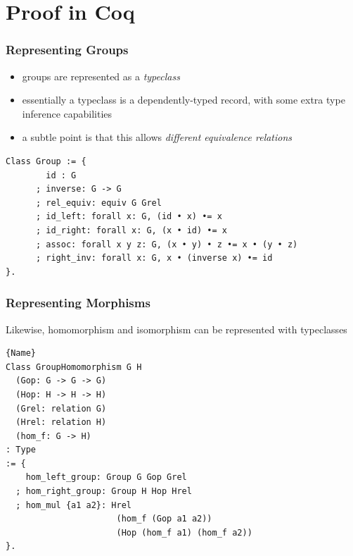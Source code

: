 \documentclass{beamer}
\begin{document}
\section{Proof in Coq}

\begin{frame}[fragile]
\frametitle{Representing Groups}
\begin{itemize}
	\item groups are represented as a \textit{typeclass}
	\item essentially a typeclass is a dependently-typed record, with some extra type inference capabilities
	\item a subtle point is that this allows \textit{different equivalence relations}
\end{itemize}

\begin{lstlisting}[language=Coq]
Class Group := {
        id : G
      ; inverse: G -> G
      ; rel_equiv: equiv G Grel
      ; id_left: forall x: G, (id • x) •= x
      ; id_right: forall x: G, (x • id) •= x
      ; assoc: forall x y z: G, (x • y) • z •= x • (y • z)
      ; right_inv: forall x: G, x • (inverse x) •= id
}.
\end{lstlisting}
\end{frame}

\begin{frame}[fragile]
\frametitle{Representing Morphisms}

Likewise, homomorphism and isomorphism can be represented with typeclasses

\begin{lstlisting}[language=Coq]{Name}
Class GroupHomomorphism G H
  (Gop: G -> G -> G) 
  (Hop: H -> H -> H) 
  (Grel: relation G)
  (Hrel: relation H)
  (hom_f: G -> H)
: Type 
:= {
    hom_left_group: Group G Gop Grel
  ; hom_right_group: Group H Hop Hrel
  ; hom_mul {a1 a2}: Hrel
                      (hom_f (Gop a1 a2)) 
                      (Hop (hom_f a1) (hom_f a2))
}.
\end{lstlisting}

\end{frame}
\end{document}
